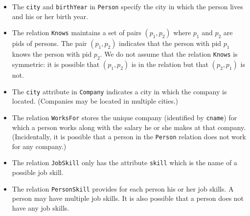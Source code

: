 \documentclass{article}
\begin{document}
\begin{itemize}
\item The {\tt city} and {\tt birthYear} in {\tt Person}
specify the city in which the person lives and his or her birth year.

\item The relation {\tt Knows} maintains a set of pairs $(p_1,p_2)$ where $p_1$ 
and $p_2$ are pids of persons.   The pair $(p_1,p_2)$ indicates that the person with
pid $p_1$ knows the person with pid $p_2$.
We do not assume that the relation {\tt Knows} is
symmetric: it is possible that $(p_1,p_2)$ is in the relation but that
$(p_2,p_1)$ is not.

\item The {\tt city} attribute in
{\tt Company} indicates a city in which the company is located.
(Companies may be located in multiple cities.)

\item The relation {\tt WorksFor} stores the unique company (identified by {\tt cname}) for which a person
works along with the salary he or she makes at that company.
(Incidentally, it is possible that a person in the {\tt Person} relation does not
work for any company.)

\item The relation {\tt JobSkill} only has the attribute {\tt skill} which is the name of a possible
job skill.    

\item The relation {\tt PersonSkill} provides for each person his or her job skills.
A person may have multiple job skills.   It is also possible that a person does not
have any job skills.
\end{itemize}
\end{document}
